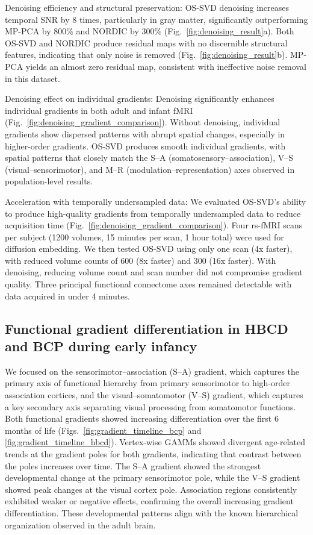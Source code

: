 Denoising efficiency and structural preservation: OS-SVD denoising increases temporal SNR by 8 times, particularly in gray matter, significantly outperforming MP-PCA by 800\% and NORDIC by 300\% (Fig.~\ref{fig:denoising_result}a). Both OS-SVD and NORDIC produce residual maps with no discernible structural features, indicating that only noise is removed (Fig.~\ref{fig:denoising_result}b). MP-PCA yields an almost zero residual map, consistent with ineffective noise removal in this dataset\cite{maoLoweringThermalNoise2024,maoPrecisionFunctionalGradients2026}.

Denoising effect on individual gradients: Denoising significantly enhances individual gradients in both adult and infant fMRI (Fig.~\ref{fig:denoising_gradient_comparison}). Without denoising, individual gradients show dispersed patterns with abrupt spatial changes, especially in higher-order gradients. OS-SVD produces smooth individual gradients, with spatial patterns that closely match the S--A (somatosensory--association), V--S (visual--sensorimotor), and M--R (modulation--representation) axes observed in population-level results\cite{maoPrecisionFunctionalGradients2026}.

Acceleration with temporally undersampled data: We evaluated OS-SVD's ability to produce high-quality gradients from temporally undersampled data to reduce acquisition time (Fig.~\ref{fig:denoising_gradient_comparison}). Four rs-fMRI scans per subject (1200 volumes, 15 minutes per scan, 1 hour total) were used for diffusion embedding. We then tested OS-SVD using only one scan (4x faster), with reduced volume counts of 600 (8x faster) and 300 (16x faster). With denoising, reducing volume count and scan number did not compromise gradient quality. Three principal functional connectome axes remained detectable with data acquired in under 4 minutes\cite{maoPrecisionFunctionalGradients2026}.

\subsection{Functional gradient differentiation in HBCD and BCP during early infancy}

We focused on the sensorimotor--association (S--A) gradient, which captures the primary axis of functional hierarchy from primary sensorimotor to high-order association cortices, and the visual--somatomotor (V--S) gradient, which captures a key secondary axis separating visual processing from somatomotor functions. Both functional gradients showed increasing differentiation over the first 6 months of life (Figs.~\ref{fig:gradient_timeline_bcp} and \ref{fig:gradient_timeline_hbcd}). Vertex-wise GAMMs showed divergent age-related trends at the gradient poles for both gradients, indicating that contrast between the poles increases over time. The S--A gradient showed the strongest developmental change at the primary sensorimotor pole, while the V--S gradient showed peak changes at the visual cortex pole. Association regions consistently exhibited weaker or negative effects, confirming the overall increasing gradient differentiation. These developmental patterns align with the known hierarchical organization observed in the adult brain\cite{maoFunctionalGradientsExcitation2026}.

